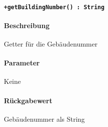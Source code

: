 \paragraph{\texttt{+getBuildingNumber() : String}}%
\paragraph*{Beschreibung}
Getter für die Gebäudenummer
\paragraph*{Parameter}
Keine
\paragraph*{Rückgabewert}
Gebäudenummer als String
